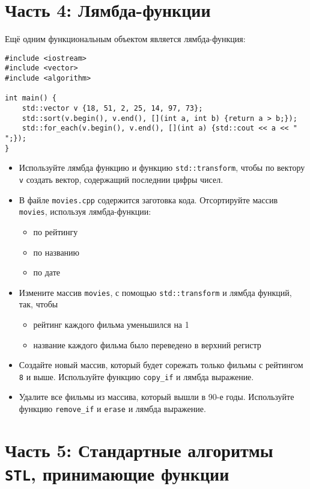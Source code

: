 \documentclass{article}
\begin{document}
\newpage
\section*{Часть 4: Лямбда-функции}
Ещё одним функциональным объектом является лямбда-функция:
\begin{lstlisting}
#include <iostream>
#include <vector>
#include <algorithm>

int main() {
    std::vector v {18, 51, 2, 25, 14, 97, 73};
    std::sort(v.begin(), v.end(), [](int a, int b) {return a > b;});
    std::for_each(v.begin(), v.end(), [](int a) {std::cout << a << " ";});
}

\end{lstlisting}

\begin{itemize}
\item Используйте лямбда функцию и функцию \texttt{std::transform}, чтобы по вектору \texttt{v} создать вектор, содержащий последнии цифры чисел.
\item В файле \texttt{movies.cpp} содержится заготовка кода. Отсортируйте массив \texttt{movies}, используя лямбда-функции:
\begin{itemize}
\item по рейтингу
\item по названию
\item по дате
\end{itemize}
\item Измените массив \texttt{movies}, с помощью \texttt{std::transform} и лямбда функций, так, чтобы
\begin{itemize}
\item рейтинг каждого фильма уменьшился на 1
\item название каждого фильма было переведено в верхний регистр
\end{itemize}

\item Создайте новый массив, который будет сорежать только фильмы с рейтингом \texttt{8} и выше. Используйте функцию \texttt{copy\_if} и лямбда выражение.

\item Удалите все фильмы из массива, который вышли в 90-е годы. Используйте функцию \texttt{remove\_if} и \texttt{erase} и лямбда выражение.
\end{itemize}


\section*{Часть 5: Стандартные алгоритмы \texttt{STL}, принимающие функции}
\end{document}
